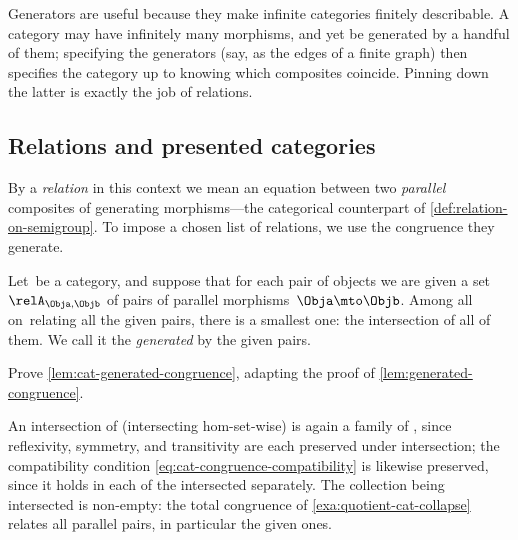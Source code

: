 \begin{remark}
    Generators are useful because they make infinite categories finitely describable.
    A category may have infinitely many morphisms, and yet be generated by a handful of them; specifying the generators (say, as the edges of a finite graph) then specifies the category up to knowing which composites coincide.
    Pinning down the latter is exactly the job of relations.
\end{remark}

\subsection{Relations and presented categories}

By a \emph{relation} in this context we mean an equation between two \emph{parallel} composites of generating morphisms---the categorical counterpart of \cref{def:relation-on-semigroup}.
To impose a chosen list of relations, we use the congruence they generate.

\begin{lemma}
    \label{lem:cat-generated-congruence}
    Let~\CatC be a category, and suppose that for each pair of objects we are given a set~$\relA_{\Obja, \Objb}$ of pairs of parallel morphisms~$\Obja \mto \Objb$.
    Among all  on~\CatC relating all the given pairs, there is a smallest one: the intersection of all of them.
    We call it the  \emph{generated} by the given pairs.
\end{lemma}

\begin{exercise}
    \label{ex:cat-generated-congruence}
    Prove \cref{lem:cat-generated-congruence}, adapting the proof of \cref{lem:generated-congruence}.
\end{exercise}
\begin{solution}
    An intersection of  (intersecting hom-set-wise) is again a family of , since reflexivity, symmetry, and transitivity are each preserved under intersection; the compatibility condition \cref{eq:cat-congruence-compatibility} is likewise preserved, since it holds in each of the intersected  separately.
    The collection being intersected is non-empty: the total congruence of \cref{exa:quotient-cat-collapse} relates all parallel pairs, in particular the given ones.
\end{solution}

